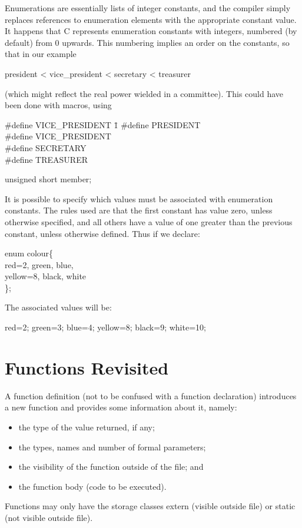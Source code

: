 Enumerations are essentially lists of integer constants,
and the compiler simply replaces references to enumeration elements
with the appropriate constant value.
It happens  that C represents enumeration constants with integers,
numbered (by default)  from 0 
upwards. This  numbering implies
an order  on  the constants, so that in our example
\begin{code}
president < vice\_president < secretary < treasurer
\end{code}
\noindent
     (which might reflect  the real  power wielded  in a  committee).
This could have been done with macros, using
\begin{code}
  \#define VICE\_PRESIDENT \= 1 \kill
  \#define PRESIDENT        \\
  \#define VICE\_PRESIDENT  \\
  \#define SECRETARY        \\
  \#define TREASURER        \addVspace

  unsigned short member;
\end{code}
\noindent
     It is possible to specify which  values must be associated with
enumeration constants. 
The  rules used are  that the  first
constant  has value  zero, unless otherwise  specified, and  all
others  have a value of one greater than the previous constant,
unless otherwise defined. Thus if we declare:
\begin{code}
enum colour\{  \+\\
  red=2, green, blue, \\
  yellow=8, black, white \-\\
 \};
\end{code}
\noindent
     The associated values will be:
\begin{code}
red=2;   green=3;   blue=4;   yellow=8;  black=9;  white=10;
\end{code}
\noindent


\section{Functions Revisited}
     A {\kc function  definition\/} (not  to be  confused with a
function declaration) introduces a new function and provides some
information about it, namely:
 \begin{itemize}
\item the type of the value returned, if any;

\item the types, names and number of formal parameters;

\item the visibility of the function outside of the file; and

\item the function body (code to be executed).
\end{itemize}
     Functions may only have the storage 
classes {\cd extern} (visible
outside file) or {\cd static} (not visible outside file).

